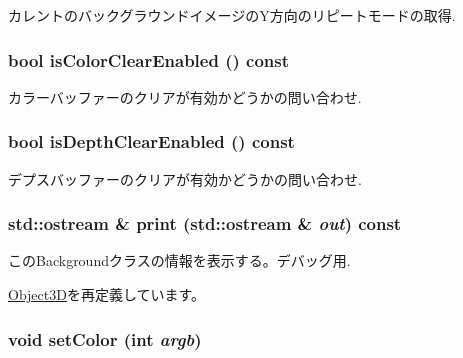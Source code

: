 カレントのバックグラウンドイメージのY方向のリピートモードの取得. \hypertarget{classm3g_1_1Background_d6b7bfdf4225b509549e2fbb9575b509}{
\subsubsection[{isColorClearEnabled}]{\setlength{\rightskip}{0pt plus 5cm}bool isColorClearEnabled () const}}
\label{classm3g_1_1Background_d6b7bfdf4225b509549e2fbb9575b509}


カラーバッファーのクリアが有効かどうかの問い合わせ. \hypertarget{classm3g_1_1Background_d20a03183cd1c6418dcadf94ac0ca470}{
\subsubsection[{isDepthClearEnabled}]{\setlength{\rightskip}{0pt plus 5cm}bool isDepthClearEnabled () const}}
\label{classm3g_1_1Background_d20a03183cd1c6418dcadf94ac0ca470}


デプスバッファーのクリアが有効かどうかの問い合わせ. \hypertarget{classm3g_1_1Background_6fea17fa1532df3794f8cb39cb4f911f}{
\subsubsection[{print}]{\setlength{\rightskip}{0pt plus 5cm}std::ostream \& print (std::ostream \& {\em out}) const}}
\label{classm3g_1_1Background_6fea17fa1532df3794f8cb39cb4f911f}


このBackgroundクラスの情報を表示する。デバッグ用. 

\hyperlink{classm3g_1_1Object3D_6fea17fa1532df3794f8cb39cb4f911f}{Object3D}を再定義しています。\hypertarget{classm3g_1_1Background_38439e862c59a31b90e57c18669061ae}{
\subsubsection[{setColor}]{\setlength{\rightskip}{0pt plus 5cm}void setColor (int {\em argb})}}
\label{classm3g_1_1Background_38439e862c59a31b90e57c18669061ae}


